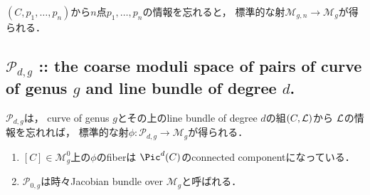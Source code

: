 \documentclass[a4paper]{jsarticle}
\newcommand{\tp}[2]{\texorpdfstring{#1}{#2}}
\newcommand{\modM}{\mathcal{M}}
\newcommand{\modP}{\mathcal{P}}
\begin{document}
    $(C, p_1,\dots,p_n)$から$n$点$p_1,\dots,p_n$の情報を忘れると，
    標準的な射$\modM_{g,n} \to \modM_g$が得られる．

    \subsection{\tp{$\modP_{d,g}$}{Pdg}
        :: the coarse moduli space of pairs of curve of genus \tp{$g$}{g} and line bundle of degree \tp{$d$}{d}. }
    $\modP_{d,g}$は，
    curve of genus $g$とその上のline bundle of degree $d$の組$(C, \mathcal{L})$から
    $\mathcal{L}$の情報を忘れれば，
    標準的な射$\phi: \modP_{d,g} \to \modM_g$が得られる．

    \begin{enumerate}[leftmargin=*]
        \item
            $[C] \in \modM_g^0$上の$\phi$のfiberは
            $\Pic^d(C)$のconnected componentになっている．

        \item
            $\modP_{0,g}$は時々Jacobian bundle over $\modM_g$と呼ばれる．
    \end{enumerate}



\end{document}
